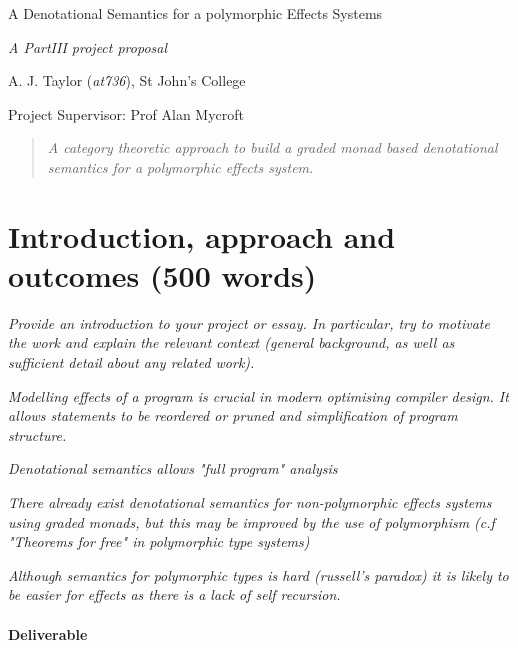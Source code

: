 \documentclass[11pt]{article}
\newcommand\comment[1]{}
\begin{document}
\centerline{\Large A Denotational Semantics for a polymorphic Effects Systems}
\vspace{2em}
\centerline{\Large \emph{A PartIII project proposal}}
\vspace{2em}
\centerline{\large A. J. Taylor (\emph{at736}), St John's College}
\vspace{1em}
\centerline{\large Project Supervisor: Prof Alan Mycroft}
\vspace{1em}

\begin{abstract}
\textsl{
	A category theoretic approach to build a graded monad based denotational semantics for a polymorphic effects system.
} 
\end{abstract}

\section{Introduction, approach and outcomes (500 words)}

\textsl{Provide an introduction to your project or essay. In particular, try to
  motivate the work and explain the relevant context (general
  background, as well as sufficient detail about any related
  work).}

\textsl{
Modelling effects of a program is crucial in modern optimising compiler design. It allows statements to be reordered or pruned and simplification of program structure.
}

\textsl{
Denotational semantics allows "full program" analysis
}

\textsl{
There already exist denotational semantics for non-polymorphic effects systems using graded monads, but this may be improved by the use of polymorphism (c.f "Theorems for free" in polymorphic type systems)
}

\textsl{
Although semantics for polymorphic types is hard (russell's paradox) it is likely to be easier for effects as there is a lack of self recursion.
}


\paragraph{Deliverable}{

}

\comment {
What's the basic idea and approach? What are you thinking of  doing, and how is it going to solve the problem (or need) you've  identified. What are you going to ``produce''?  A project will typically produce one (or perhaps more) of the following: a piece of software, an evaluation of a published result, a proof, or the design (and perhaps the construction of) a new piece of hardware. An essay will typically either review and critique a particular area of the academic literature, or evaluate a published result or proof. Try to  name the specific things (and describe them) in this part of the  proposal -- this will allow you to refer to them in the next.} 
\end{document}
